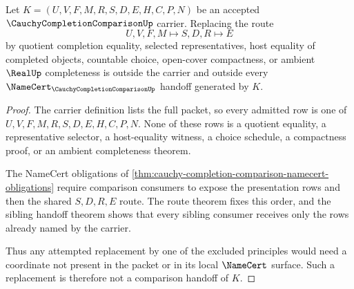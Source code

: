 \begin{theorem}
\label{thm:cauchy-completion-comparison-nonquotient-boundary}
Let $K=(U,V,F,M,R,S,D,E,H,C,P,N)$ be an accepted $\CauchyCompletionComparisonUp$ carrier. Replacing the route
$$
U,V,F,M \longmapsto S,D,R \longmapsto E
$$
by quotient completion equality, selected representatives, host equality of completed objects, countable choice, open-cover compactness, or ambient $\RealUp$ completeness is outside the carrier and outside every $\NameCert_{\CauchyCompletionComparisonUp}$ handoff generated by $K$.
\end{theorem}
\begin{proof}
The carrier definition lists the full packet, so every admitted row is one of $U,V,F,M,R,S,D,E,H,C,P,N$. None of these rows is a quotient equality, a representative selector, a host-equality witness, a choice schedule, a compactness proof, or an ambient completeness theorem.

The NameCert obligations of \autoref{thm:cauchy-completion-comparison-namecert-obligations} require comparison consumers to expose the presentation rows and then the shared $S,D,R,E$ route. The route theorem fixes this order, and the sibling handoff theorem shows that every sibling consumer receives only the rows already named by the carrier.

Thus any attempted replacement by one of the excluded principles would need a coordinate not present in the packet or in its local $\NameCert$ surface. Such a replacement is therefore not a comparison handoff of $K$.
\end{proof}

\begin{closurestatus}{\CauchyCompletionComparisonUp}
  \theoryclosure{\seedClosure}
  \formalstatus{\unformalizedV}
\end{closurestatus}
